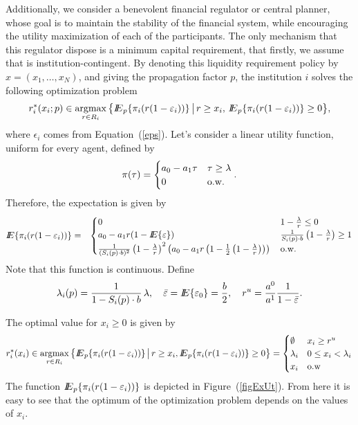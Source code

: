 Additionally, we consider a benevolent financial regulator or central planner, whose goal is to maintain the stability of the financial system, while encouraging the utility maximization of each of the participants.  The only mechanism that this regulator dispose is a minimum capital requirement, that firstly, we assume that is institution-contingent.  By denoting this liquidity requirement policy by $x=(x_1,\ldots,x_N)$, and giving the propagation factor $p$, the institution $i$ solves the following optimization problem
\begin{equation}\label{imax}
r^*_i(x_i;p)\in\mathop{\rm argmax}_{r\in R_i} \big\lbrace {I\kern-.35em E}_p\{ \pi_i(r(1-\varepsilon_i))\} {\,\big\vert\,} r\geq x_i,\,{I\kern-.35em E}_p\{\pi_i(r(1-\varepsilon_i))\}\geq 0\big\rbrace,
\end{equation}
where $\epsilon_i$ comes from Equation~(\ref{eps}).  Let's consider a linear utility function, uniform for every agent, defined by
\[\pi(\tau)=\begin{cases} a_0-a_1\tau&\tau\geq \lambda\\ 0 & {\rm o.w.}\end{cases}.\]
Therefore, the expectation is given by
\begin{eqnarray*}
{I\kern-.35em E}\{ \pi_i(r(1-\varepsilon_i))\}&=&\begin{cases}
0&1-\frac{\lambda}{r}\leq 0\\
a_0-a_1r(1-{I\kern-.35em E}\{\varepsilon\})&\frac{1}{S_i(p)\cdot b}\left(1-\frac{\lambda}{r}\right)\geq 1\\
\frac{1}{(S_i(p)\cdot b)^2}\left(1-\frac{\lambda}{r}\right)^2\left(a_0-a_1r\left(1-\frac{1}{2}\left(1-\frac{\lambda}{r}\right)\right)\right)\,&{\rm o.w.}
\end{cases}
\end{eqnarray*}
Note that this function is continuous.  Define 
\[\lambda_i(p)=\frac{1}{1-S_i(p)\cdot b}\,\lambda, \quad \bar{\varepsilon}={I\kern-.35em E}\{\varepsilon_0\}=\frac{b}{2},\quad r^u=\frac{a^0}{a^1}\frac{1}{1-\bar{\varepsilon}}.\]

The optimal value for $x_i\geq 0$ is given by
\begin{equation}\label{optri}
r_i^*(x_i)\in\mathop{\rm argmax}_{r\in R_i} \big\lbrace {I\kern-.35em E}_p\{ \pi_i(r(1-\varepsilon_i))\}{\,\big\vert\,} r\geq x_i, {I\kern-.35em E}_p\{ \pi_i(r(1-\varepsilon_i))\}\geq 0\big\rbrace = \begin{cases}
\emptyset & x_i\geq r^u\\
\lambda_i& 0\leq x_i<\lambda_i\\
x_i& \mbox{o.w}\end{cases}
\end{equation}
The function ${I\kern-.35em E}_p\{ \pi_i(r(1-\varepsilon_i))\}$ is depicted in Figure~(\ref{figExUt}).  From here it is easy to see that the optimum of the optimization problem depends on the values of $x_i$.

